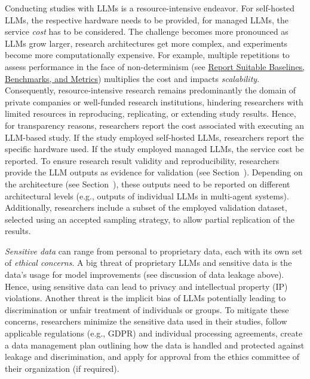 Conducting studies with LLMs is a resource-intensive endeavor.
For self-hosted LLMs, the respective hardware needs to be provided, for managed LLMs, the service \emph{cost} has to be considered.
The challenge becomes more pronounced as LLMs grow larger, research architectures get more complex, and experiments become more computationally expensive.
For example, multiple repetitions to assess performance in the face of non-determinism (see \href{/guidelines/report-baselines-benchmarks-and-metrics}{Report Suitable Baselines, Benchmarks, and Metrics}) multiplies the cost and impacts \emph{scalability}.
Consequently, resource-intensive research remains predominantly the domain of private companies or well-funded research institutions, hindering researchers with limited resources in reproducing, replicating, or extending study results.
Hence, for transparency reasons, researchers \should report the cost associated with executing an LLM-based study. 
If the study employed self-hosted LLMs, researchers \should report the specific hardware used. 
If the study employed managed LLMs, the service cost \should be reported.
To ensure research result validity and reproducibility, researchers \must provide the LLM outputs as evidence for validation (see Section~\prompts).
Depending on the architecture (see Section~\toolarchitecture), these outputs need to be reported on different architectural levels (e.g., outputs of individual LLMs in multi-agent systems).
Additionally, researchers \should include a subset of the employed validation dataset, selected using an accepted sampling strategy, to allow partial replication of the results.

\emph{Sensitive data} can range from personal to proprietary data, each with its own set of \emph{ethical concerns}.
A big threat of proprietary LLMs and sensitive data is the data's usage for model improvements (see discussion of data leakage above).
Hence, using sensitive data can lead to privacy and intellectual property (IP) violations.
Another threat is the implicit bias of LLMs potentially leading to discrimination or unfair treatment of individuals or groups.
To mitigate these concerns, researchers \should minimize the sensitive data used in their studies, \must follow applicable regulations (e.g., GDPR) and individual processing agreements, \should create a data management plan outlining how the data is handled and protected against leakage and discrimination, and \must apply for approval from the ethics committee of their organization (if required).


